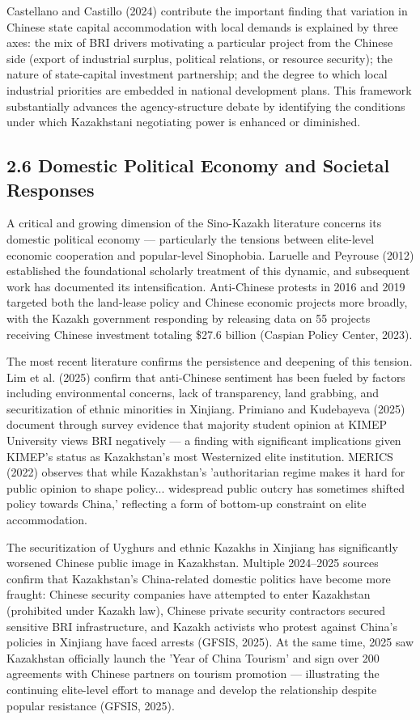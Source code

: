 \documentclass[12pt]{article}
\begin{document}
Castellano and Castillo (2024) contribute the important finding that variation in Chinese state capital accommodation with local demands is explained by three axes: the mix of BRI drivers motivating a particular project from the Chinese side (export of industrial surplus, political relations, or resource security); the nature of state-capital investment partnership; and the degree to which local industrial priorities are embedded in national development plans. This framework substantially advances the agency-structure debate by identifying the conditions under which Kazakhstani negotiating power is enhanced or diminished.\par
\subsection{2.6 Domestic Political Economy and Societal Responses}
A critical and growing dimension of the Sino-Kazakh literature concerns its domestic political economy --- particularly the tensions between elite-level economic cooperation and popular-level Sinophobia. Laruelle and Peyrouse (2012) established the foundational scholarly treatment of this dynamic, and subsequent work has documented its intensification. Anti-Chinese protests in 2016 and 2019 targeted both the land-lease policy and Chinese economic projects more broadly, with the Kazakh government responding by releasing data on 55 projects receiving Chinese investment totaling \$27.6 billion (Caspian Policy Center, 2023).\par
The most recent literature confirms the persistence and deepening of this tension. Lim et al. (2025) confirm that anti-Chinese sentiment has been fueled by factors including environmental concerns, lack of transparency, land grabbing, and securitization of ethnic minorities in Xinjiang. Primiano and Kudebayeva (2025) document through survey evidence that majority student opinion at KIMEP University views BRI negatively --- a finding with significant implications given KIMEP's status as Kazakhstan's most Westernized elite institution. MERICS (2022) observes that while Kazakhstan's 'authoritarian regime makes it hard for public opinion to shape policy... widespread public outcry has sometimes shifted policy towards China,' reflecting a form of bottom-up constraint on elite accommodation.\par
The securitization of Uyghurs and ethnic Kazakhs in Xinjiang has significantly worsened Chinese public image in Kazakhstan. Multiple 2024--2025 sources confirm that Kazakhstan's China-related domestic politics have become more fraught: Chinese security companies have attempted to enter Kazakhstan (prohibited under Kazakh law), Chinese private security contractors secured sensitive BRI infrastructure, and Kazakh activists who protest against China's policies in Xinjiang have faced arrests (GFSIS, 2025). At the same time, 2025 saw Kazakhstan officially launch the 'Year of China Tourism' and sign over 200 agreements with Chinese partners on tourism promotion --- illustrating the continuing elite-level effort to manage and develop the relationship despite popular resistance (GFSIS, 2025).\par
\end{document}
